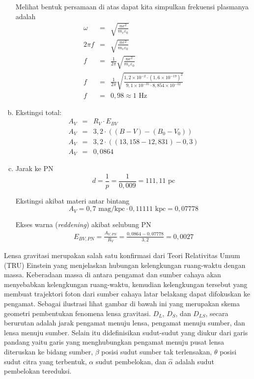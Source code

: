 \documentclass[11pt,fleqn]{exam}
\begin{document}
\begin{questions}
\begin{enumerate}[a.]
    Melihat bentuk persamaan di atas dapat kita simpulkan frekuensi plasmanya adalah
    \begin{eqnarray*}
        \omega &=& \sqrt{\frac{n e^2}{m_e \varepsilon_0}} \\
        2 \pi f &=& \sqrt{\frac{n e^2}{m_e \varepsilon_0}} \\
        f &=& \frac{1}{2 \pi} \sqrt{\frac{n e^2}{m_e \varepsilon_0}}\\
        f &=& \frac{1}{2 \pi} \sqrt{\frac{1,2 \times 10^{-2} \cdot (1,6 \times 10^{-19})^2}{9,1 \times 10^{-31} \cdot 8,854 \times 10^{-12}}}\\
        f &=& 0,98 \approx 1 \text{ Hz}
    \end{eqnarray*}

    \item Ekstingsi total:
    \begin{eqnarray*}
        A_V &=& R_V \cdot E_{BV}\\
        A_V &=& 3,2 \cdot \left((B-V) - (B_0-V_0) \right)\\
        A_V &=& 3,2 \cdot \left((13,158-12,831) - 0,3 \right)\\
        A_V &=& 0,0864
    \end{eqnarray*}
    
    \item Jarak ke PN 
    $$d = \frac{1}{p} = \frac{1}{0,009} = 111,11 \text{ pc}$$
    
    Ekstingsi akibat materi antar bintang
    $$A_V = 0,7 \text{ mag/kpc} \cdot 0,11111 \text{ kpc} = 0,07778$$
    
    Ekses warna (\textit{reddening}) akibat selubung PN
    \begin{eqnarray*}
        E_{BV, PN} = \frac{A_{V, PN}}{R_V} = \frac{0,0864 - 0,07778}{3,2} = 0,0027
    \end{eqnarray*}
    
    
    
\end{enumerate}


\newpage 
\question Lensa gravitasi merupakan salah satu konfirmasi dari Teori Relativitas Umum (TRU) Einstein yang menjelaskan hubungan kelengkungan ruang-waktu dengan massa. Keberadaan massa di antara pengamat dan sumber cahaya akan menyebabkan kelengkungan ruang-waktu, kemudian kelengkungan tersebut yang membuat trajektori foton dari sumber cahaya latar belakang dapat difokuskan ke pengamat. Sebagai ilustrasi lihat gambar di bawah ini yang merupakan skema geometri pembentukan fenomena lensa gravitasi. $D_L$, $D_S$, dan $D_{LS}$, secara berurutan adalah jarak pengamat menuju lensa, pengamat menuju sumber, dan lensa menuju sumber. Selain itu didefinisikan sudut-sudut yang diukur dari garis pandang yaitu garis yang menghubungkan pengamat menuju pusat lensa diteruskan ke bidang sumber, $\beta$ posisi sudut sumber tak terlensakan, $\theta$ posisi sudut citra yang terbentuk, $\alpha$ sudut pembelokan, dan $\widehat{\alpha}$ adalah sudut pembelokan tereduksi.


\end{questions}
\end{document}
